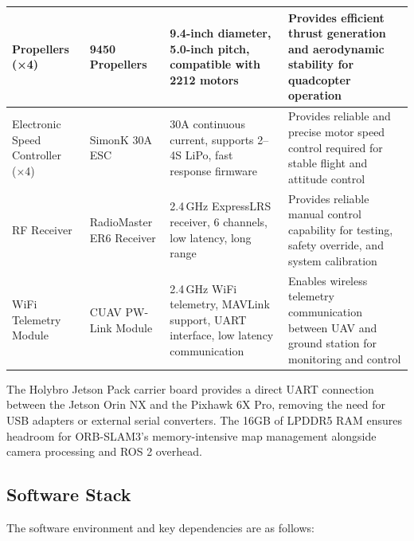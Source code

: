 \begin{table}[H]
{\begin{tabular}{|p{3.0cm}|p{3.2cm}|p{7.3cm}|p{7.3cm}|}
\hline
Propellers (×4) & 9450 Propellers &
9.4-inch diameter, 5.0-inch pitch, compatible with 2212 motors\cite{propeller_9450} &
Provides efficient thrust generation and aerodynamic stability for quadcopter operation \\

\hline
Electronic Speed Controller (×4) & SimonK 30A ESC &
30A continuous current, supports 2--4S LiPo, fast response firmware\cite{motor_2212_920kv} &
Provides reliable and precise motor speed control required for stable flight and attitude control \\

\hline
RF Receiver & RadioMaster ER6 Receiver &
2.4\,GHz ExpressLRS receiver, 6 channels, low latency, long range\cite{radiomaster} &
Provides reliable manual control capability for testing, safety override, and system calibration \\

\hline
WiFi Telemetry Module & CUAV PW-Link Module &
2.4\,GHz WiFi telemetry, MAVLink support, UART interface, low latency communication\cite{cuav_pwlink_datasheet} &
Enables wireless telemetry communication between UAV and ground station for monitoring and control \\
\hline

\end{tabular}}
\label{tab:hardware_components}
\end{table}


The Holybro Jetson Pack carrier board provides a direct UART connection between the Jetson Orin NX and the Pixhawk 6X Pro, removing the need for USB adapters or external serial converters. The 16GB of LPDDR5 RAM ensures headroom for ORB-SLAM3's memory-intensive map management alongside camera processing and ROS 2 overhead.

\subsection{Software Stack}
The software environment and key dependencies are as follows:

